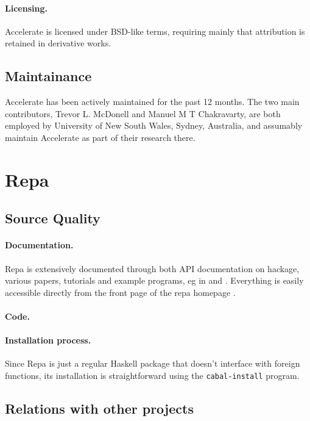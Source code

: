 \paragraph{Licensing.} Accelerate is licensed under BSD-like terms, requiring
mainly that attribution is retained in derivative works.

\subsection{Maintainance}

Accelerate has been actively maintained for the
past 12 months.
The two main contributors, Trevor L. McDonell and Manuel M
T Chakravarty, are both employed by University of New South Wales, Sydney,
Australia, and assumably maintain Accelerate as part of their research there.

\section{Repa}

\subsection{Source Quality}

\paragraph{Documentation.} Repa is extensively documented through both API
documentation on hackage, various papers, tutorials and example programs, eg in
\cite{lippmeier2012guiding} and \cite{keller2010regular}.  Everything is easily
accessible directly from the front page of the repa homepage
\cite{homepage:repa}.

\paragraph{Code.}
\todo{\ldots}

\paragraph{Installation process.} Since Repa is just a regular Haskell package
that doesn't interface with foreign functions, its installation is
straightforward using the \texttt{cabal-install} program.

\subsection{Relations with other projects}

